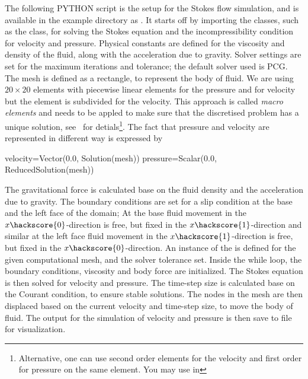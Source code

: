 The following PYTHON script is the setup for the Stokes flow simulation, and is available in the example directory as . It starts off by importing the classes, such as the  class, for solving the Stokes equation and the incompressibility condition for velocity and pressure. Physical constants are defined for the viscosity and density of the fluid, along with the acceleration due to gravity. Solver settings are set for the maximum iterations and tolerance; the default solver used is PCG. The mesh is defined as a rectangle, to represent the body of fluid. We are using $20 \times 20$ elements with piecewise linear elements for the pressure and
for velocity but the element is subdivided for the velocity. This approach is called \textit{macro elements} and needs to be appled to make sure that the discretised problem has a unique 
solution, see~\cite{LBB} for detials\footnote{Alternative, one can use second order elements for the velocity and first order for pressure on the same element. You may use  in }. The fact that pressure and velocity are represented in different way is expressed by
\begin{python}
velocity=Vector(0.0, Solution(mesh))
pressure=Scalar(0.0, ReducedSolution(mesh))
\end{python}
The gravitational force is calculated base on the fluid density and the acceleration due to gravity. The boundary conditions are set for a slip condition at the base and the left face of the domain; At the base fluid movement in the $x\hackscore{0}$-direction is free, but fixed in the $x\hackscore{1}$-direction and
similar at the left face fluid movement in the $x\hackscore{1}$-direction is free, but fixed in the $x\hackscore{0}$-direction. An instance of the  is defined for the given computational mesh, and the solver tolerance set. Inside the while loop, the boundary conditions, viscosity and body force are initialized. The Stokes equation is then solved for velocity and pressure. The time-step size is calculated base on the Courant condition, to ensure stable solutions. The nodes in the mesh are then displaced based on the current velocity and time-step size, to move the body of fluid. The output for the simulation of velocity and pressure is then save to file for visualization. 
%
